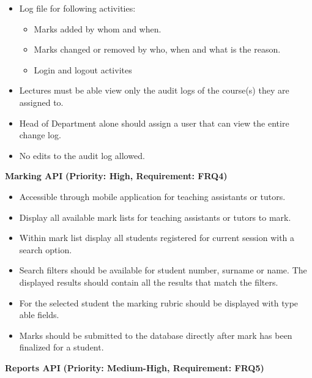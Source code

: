\documentclass[12pt]{article}
\begin{document}
				\begin{itemize}
					\item Log file for following activities:
							\begin{itemize}
							 	\item Marks added by whom and when.
							 	\item Marks changed or removed by who, when and what is the reason.
							 	\item Login and logout activites
							\end{itemize}
		
					\item Lectures must be able view only the audit logs of the course(s) they are assigned to.
					\item Head of Department alone should assign a user that can view the entire change log.
					\item No edits to the audit log allowed.
				\end{itemize}
				
			\vspace{0.15in}
				
			\begin{flushleft}
				\textbf{Marking API}
				\textbf{(Priority: High, Requirement: FRQ4)}
			\end{flushleft}
			
				\begin{itemize}
					\item Accessible through mobile application for teaching assistants or tutors.
					\item Display all available mark lists for teaching assistants or tutors to mark.
					\item Within mark list display all students registered for current session with a search option.
					\item Search filters should be available for student number, surname or name. The displayed results should contain all the results that match the filters.
					\item For the selected student the marking rubric should be displayed with type able fields.
					\item Marks should be submitted to the database directly after mark has been finalized for a student.
				\end{itemize}
				
			\vspace{0.15in}
			
			\begin{flushleft}
				\textbf{Reports API}
				\textbf{(Priority: Medium-High, Requirement: FRQ5)}
			\end{flushleft}
			
\end{document}
